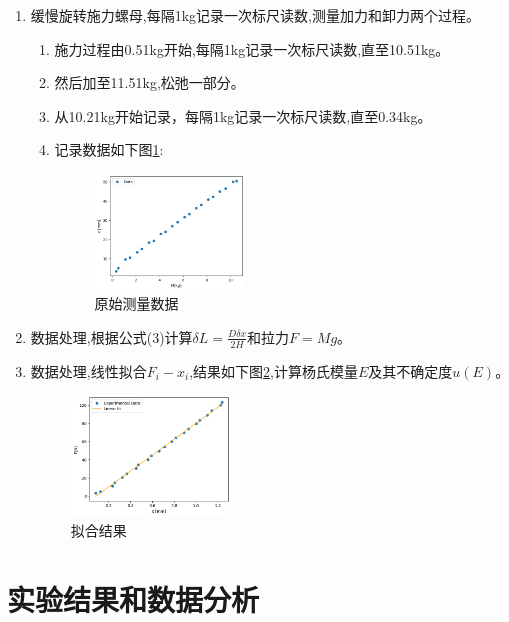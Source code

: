 \documentclass[UTF8]{ctexart}
\begin{document}
\begin{enumerate}
\begin{enumerate}
    \end{enumerate}
    \item 缓慢旋转施力螺母,每隔1kg记录一次标尺读数,测量加力和卸力两个过程。
    \begin{enumerate}
        \item 施力过程由0.51kg开始,每隔1kg记录一次标尺读数,直至10.51kg。
        \item 然后加至11.51kg,松弛一部分。
        \item 从10.21kg开始记录，每隔1kg记录一次标尺读数,直至0.34kg。
        \item 记录数据如下图\ref{fig:origin}:
        \begin{figure}[htbp]
            \centering
            \includegraphics[width=0.4\textwidth]{origin.png}
            \caption{原始测量数据}
            \label{fig:origin}
            \end{figure}
    \end{enumerate}
    \newpage
    \item 数据处理,根据公式(3)计算$\delta L=\frac{D\delta x}{2H}$和拉力$F=Mg$。
    \item 数据处理,线性拟合$F_i-x_i$,结果如下图\ref{fig:fitting},计算杨氏模量$E$及其不确定度$u(E)$。
    \begin{figure}[htbp]
        \centering
        \includegraphics[width=0.4\textwidth]{fitting.png}
        \caption{拟合结果}
        \label{fig:fitting}
    \end{figure}
\end{enumerate}

\section{实验结果和数据分析}
\end{document}
